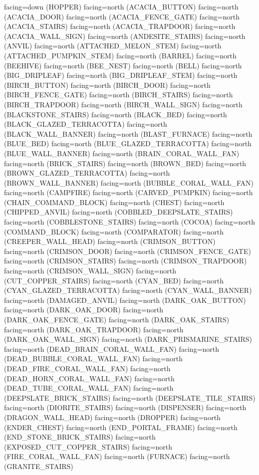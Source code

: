 \documentclass[11pt]{article}
\begin{document}
facing=down (HOPPER)
facing=north (ACACIA_BUTTON)
facing=north (ACACIA_DOOR)
facing=north (ACACIA_FENCE_GATE)
facing=north (ACACIA_STAIRS)
facing=north (ACACIA_TRAPDOOR)
facing=north (ACACIA_WALL_SIGN)
facing=north (ANDESITE_STAIRS)
facing=north (ANVIL)
facing=north (ATTACHED_MELON_STEM)
facing=north (ATTACHED_PUMPKIN_STEM)
facing=north (BARREL)
facing=north (BEEHIVE)
facing=north (BEE_NEST)
facing=north (BELL)
facing=north (BIG_DRIPLEAF)
facing=north (BIG_DRIPLEAF_STEM)
facing=north (BIRCH_BUTTON)
facing=north (BIRCH_DOOR)
facing=north (BIRCH_FENCE_GATE)
facing=north (BIRCH_STAIRS)
facing=north (BIRCH_TRAPDOOR)
facing=north (BIRCH_WALL_SIGN)
facing=north (BLACKSTONE_STAIRS)
facing=north (BLACK_BED)
facing=north (BLACK_GLAZED_TERRACOTTA)
facing=north (BLACK_WALL_BANNER)
facing=north (BLAST_FURNACE)
facing=north (BLUE_BED)
facing=north (BLUE_GLAZED_TERRACOTTA)
facing=north (BLUE_WALL_BANNER)
facing=north (BRAIN_CORAL_WALL_FAN)
facing=north (BRICK_STAIRS)
facing=north (BROWN_BED)
facing=north (BROWN_GLAZED_TERRACOTTA)
facing=north (BROWN_WALL_BANNER)
facing=north (BUBBLE_CORAL_WALL_FAN)
facing=north (CAMPFIRE)
facing=north (CARVED_PUMPKIN)
facing=north (CHAIN_COMMAND_BLOCK)
facing=north (CHEST)
facing=north (CHIPPED_ANVIL)
facing=north (COBBLED_DEEPSLATE_STAIRS)
facing=north (COBBLESTONE_STAIRS)
facing=north (COCOA)
facing=north (COMMAND_BLOCK)
facing=north (COMPARATOR)
facing=north (CREEPER_WALL_HEAD)
facing=north (CRIMSON_BUTTON)
facing=north (CRIMSON_DOOR)
facing=north (CRIMSON_FENCE_GATE)
facing=north (CRIMSON_STAIRS)
facing=north (CRIMSON_TRAPDOOR)
facing=north (CRIMSON_WALL_SIGN)
facing=north (CUT_COPPER_STAIRS)
facing=north (CYAN_BED)
facing=north (CYAN_GLAZED_TERRACOTTA)
facing=north (CYAN_WALL_BANNER)
facing=north (DAMAGED_ANVIL)
facing=north (DARK_OAK_BUTTON)
facing=north (DARK_OAK_DOOR)
facing=north (DARK_OAK_FENCE_GATE)
facing=north (DARK_OAK_STAIRS)
facing=north (DARK_OAK_TRAPDOOR)
facing=north (DARK_OAK_WALL_SIGN)
facing=north (DARK_PRISMARINE_STAIRS)
facing=north (DEAD_BRAIN_CORAL_WALL_FAN)
facing=north (DEAD_BUBBLE_CORAL_WALL_FAN)
facing=north (DEAD_FIRE_CORAL_WALL_FAN)
facing=north (DEAD_HORN_CORAL_WALL_FAN)
facing=north (DEAD_TUBE_CORAL_WALL_FAN)
facing=north (DEEPSLATE_BRICK_STAIRS)
facing=north (DEEPSLATE_TILE_STAIRS)
facing=north (DIORITE_STAIRS)
facing=north (DISPENSER)
facing=north (DRAGON_WALL_HEAD)
facing=north (DROPPER)
facing=north (ENDER_CHEST)
facing=north (END_PORTAL_FRAME)
facing=north (END_STONE_BRICK_STAIRS)
facing=north (EXPOSED_CUT_COPPER_STAIRS)
facing=north (FIRE_CORAL_WALL_FAN)
facing=north (FURNACE)
facing=north (GRANITE_STAIRS)
\end{document}
